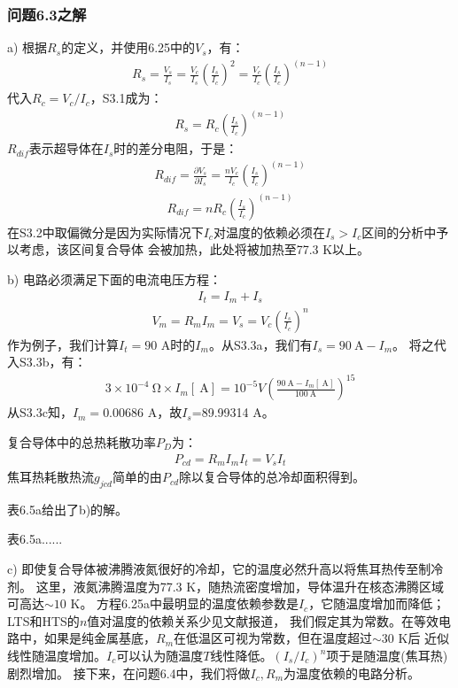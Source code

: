 \subsubsection{问题6.3之解}
a) 根据$R_s$的定义，并使用6.25中的$V_s$，有：
\begin{align*}%
R_s=\frac{V_s}{I_s}=\frac{V_c}{I_s}(\frac{I_s}{I_c})^2=\frac{V_c}{I_c}(\frac{I_s}{I_c})^{(n-1)} \tag{S3.1}
\end{align*}
代入$R_c=V_c/I_c$，S3.1成为：
\begin{align*}%
R_s=R_c(\frac{I_s}{I_c})^{(n-1)} \tag{6.26a}
\end{align*}
$R_{dif}$表示超导体在$I_s$时的差分电阻，于是：
\begin{align*}%
R_{dif}=\frac{\partial V_s}{\partial I_s}=\frac{nV_c}{I_c}(\frac{I_s}{I_c})^{(n-1)} \tag{S3.2}
\end{align*}
\begin{align*}%
R_{dif}=nR_c(\frac{I_s}{I_c})^{(n-1)} \tag{6.26a}
\end{align*}
在S3.2中取偏微分是因为实际情况下$I_c$对温度的依赖必须在$I_s>I_c$区间的分析中予以考虑，该区间复合导体
会被加热，此处将被加热至77.3 K以上。

b) 电路必须满足下面的电流电压方程：
\begin{align*}%
I_t=I_m+I_s \tag{S3.3a}
\end{align*}
\begin{align*}%
V_m=R_mI_m=V_s=V_c(\frac{I_s}{I_c})^{n} \tag{S3.3b}
\end{align*}
作为例子，我们计算$I_t=90$ A时的$I_m$。从S3.3a，我们有$I_s=90\ \mathrm{A}-I_m$。
将之代入S3.3b，有：
\begin{align*}%
3\times 10^{-4}\ \mathrm{\Omega}\times I_m[\ \mathrm{A}]=10^{-5}V(\frac{90\ \mathrm{A}-I_m[\ \mathrm{A}]}{100\ \mathrm{A}})^{15} \tag{S3.3c}
\end{align*}
从S3.3c知，$I_m=$0.00686 A，故$I_s$=89.99314 A。

复合导体中的总热耗散功率$P_D$为：
\begin{align*}%
P_{cd}=R_mI_mI_t=V_sI_t \tag{S3.4}
\end{align*}
焦耳热耗散热流$g_{jcd}$简单的由$P_{cd}$除以复合导体的总冷却面积得到。

表6.5a给出了b)的解。

表6.5a......

c) 即使复合导体被沸腾液氮很好的冷却，它的温度必然升高以将焦耳热传至制冷剂。
这里，液氮沸腾温度为77.3 K，随热流密度增加，导体温升在核态沸腾区域可高达$\sim 10$ K。
方程6.25a中最明显的温度依赖参数是$I_c$，它随温度增加而降低；LTS和HTS的$n$值对温度的依赖关系少见文献报道，
我们假定其为常数。在等效电路中，如果是纯金属基底，$R_m$在低温区可视为常数，但在温度超过$\sim 30$ K后
近似线性随温度增加。$I_c$可以认为随温度$T$线性降低。$(I_s/I_c)^n$项于是随温度(焦耳热)剧烈增加。
接下来，在问题6.4中，我们将做$I_c,R_m$为温度依赖的电路分析。

